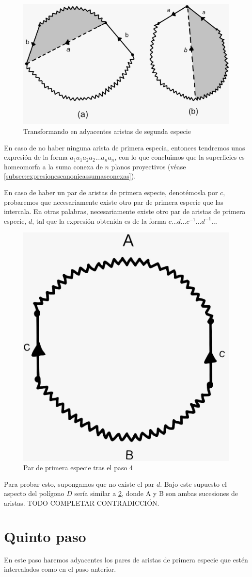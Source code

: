 \documentclass[a4paper,11pt,spanish, twoside, leqno]{tfg-uam}
\theoremstyle{definition}
\begin{document}
\begin{figure}[h!]
			\centering
			\includegraphics[width=0.4\linewidth]{imagenes/paso4.jpeg}
			\caption{Transformando en adyacentes aristas de segunda especie}
			\label{fig:paso4}
		\end{figure}



En caso de no haber ninguna arista de primera especia, entonces tendremos unas expresión de la forma $a_1a_1a_2a_2...a_na_n$, con lo que concluimos que la superficies es homeomorfa a la suma conexa de $n$ planos proyectivos (véase \ref{subsec:expresionescanonicassumasconexas}).


En caso de haber un par de  aristas de primera especie, denotémosla por $c$, probaremos que necesariamente existe otro par de primera especie que las intercala. En otras palabras, necesariamente existe otro par de aristas de primera especie, $d$, tal que la expresión obtenida es de la forma $c...d...c^{-1}...d^{-1}...$


\begin{figure}[h!]
			\centering
			\includegraphics[width=0.2\linewidth]{imagenes/paso4_2.jpeg}
			\caption{Par de primera especie tras el paso 4}
			\label{fig:paso4_2}
		\end{figure}


Para probar esto, supongamos que no existe el par $d$. Bajo este supuesto el aspecto del polígono $D$ sería similar a \ref{fig:paso4_2}, donde A y B son ambas sucesiones de aristas. TODO COMPLETAR CONTRADICCIÓN.

\section{Quinto paso}
En este paso haremos adyacentes los pares de aristas de primera especie que estén intercalados como en el paso anterior.
\end{document}
